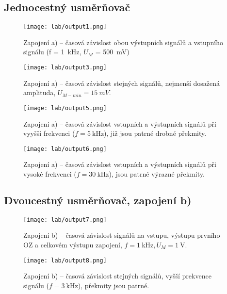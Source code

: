 \subsection{Jednocestný usměrňovač}
\begin{figure}[h!]
    \centering
    \texttt{[image: lab/output1.png]}
    \caption{Zapojení a) -- časová závislost obou výstupních signálů a vstupního signálu (f = \qty{1}{\kilo\hertz}, \(U_M\) = \qty{500}{\milli\volt})}
    \label{fig:lab/output1.png}
\end{figure}

\begin{figure}[h!]
    \centering
    \texttt{[image: lab/output3.png]}
    \caption{Zapojení a) -- časová závislost stejných signálů, nejmenší dosažená amplituda, \(U_{M - min }=\qty{15}{mV}\).}
    \label{fig:lab-output3-png}
\end{figure}


\begin{figure}[h!]
    \centering
    \texttt{[image: lab/output5.png]}
    \caption{Zapojení a) -- časová závislost vstupních a výstupních signálů při vyyšší frekvenci (\(f=\qty{5}{\kilo\hertz}\)), již jsou patrné drobné překmity.}
    \label{fig:lab-output5-png}
\end{figure}

\begin{figure}[h!]
    \centering
    \texttt{[image: lab/output6.png]}
    \caption{Zapojení a) -- časová závislost vstupních a výstupních signálů při vysoké frekvenci (\(f=\qty{30}{\kilo\hertz}\)), jsou patrné výrazné překmity.}
    \label{fig:lab-output6-png}
\end{figure}

\clearpage
\subsection{Dvoucestný usměrňovač, zapojení b)}
\begin{figure}[h!]
    \centering
    \texttt{[image: lab/output7.png]}
    \caption{Zapojení b) -- časová závislost signálů na vstupu, výstupu prvního OZ a celkovém výstupu zapojení, \(f=\qty{1}{\kilo\hertz}, U_M=\qty{1}{\volt}\).}
    \label{fig:lab-output7-png}
\end{figure}

\begin{figure}[h!]
    \centering
    \texttt{[image: lab/output8.png]}
    \caption{Zapojení b) -- časová závislost stejných signálů, vyšší prekvence signálu (\(f=\qty{3}{\kilo\hertz}\)), překmity jsou patrné.}
    \label{fig:lab-output8-png}
\end{figure}


